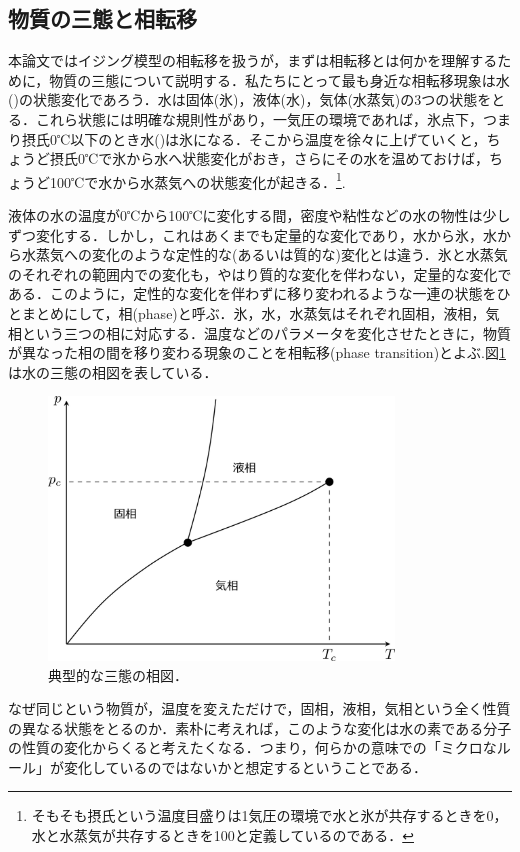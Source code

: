 \documentclass[a4paper,11pt]{jsreport}
\begin{document}
\subsection{物質の三態と相転移}
本論文ではイジング模型の相転移を扱うが，まずは相転移とは何かを理解するために，物質の三態について説明する．私たちにとって最も身近な相転移現象は水()の状態変化であろう．水は固体(氷)，液体(水)，気体(水蒸気)の3つの状態をとる．これら状態には明確な規則性があり，一気圧の環境であれば，氷点下，つまり摂氏0℃以下のとき水()は氷になる．そこから温度を徐々に上げていくと，ちょうど摂氏0℃で氷から水へ状態変化がおき，さらにその水を温めておけば，ちょうど100℃で水から水蒸気への状態変化が起きる．\footnote{そもそも摂氏という温度目盛りは1気圧の環境で水と氷が共存するときを0，水と水蒸気が共存するときを100と定義しているのである．}.\par
液体の水の温度が0℃から100℃に変化する間，密度や粘性などの水の物性は少しずつ変化する．しかし，これはあくまでも定量的な変化であり，水から氷，水から水蒸気への変化のような定性的な(あるいは質的な)変化とは違う．氷と水蒸気のそれぞれの範囲内での変化も，やはり質的な変化を伴わない，定量的な変化である．このように，定性的な変化を伴わずに移り変われるような一連の状態をひとまとめにして，相(phase)と呼ぶ．氷，水，水蒸気はそれぞれ固相，液相，気相という三つの相に対応する．温度などのパラメータを変化させたときに，物質が異なった相の間を移り変わる現象のことを相転移(phase transition)とよぶ.図\ref{三態相図}は水の三態の相図を表している．\par
\begin{figure}[H]
   \begin{center}
       \includegraphics[height=7cm]{image/三態相図.png}
       \caption{典型的な三態の相図．}
       \label{三態相図}
   \end{center}
\end{figure}
なぜ同じという物質が，温度を変えただけで，固相，液相，気相という全く性質の異なる状態をとるのか．素朴に考えれば，このような変化は水の素である分子の性質の変化からくると考えたくなる．つまり，何らかの意味での「ミクロなルール」が変化しているのではないかと想定するということである．\par
\end{document}
